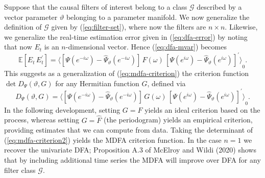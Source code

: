 \documentclass[a4paper]{book}
\def\EE{\mathbb E}
\begin{document}
Suppose that the causal filters of interest belong to a class
  $\mathcal{G}$  described by a vector parameter $\vartheta$ belonging to a 
 parameter manifold.  We now generalize the definition of $\mathcal{G}$ given
  by (\ref{eq:filter-set}),  where now the filters are $n \times n$.
  Likewise, we generalize the real-time estimation error   given in (\ref{eq:dfa-error})
 by noting that now $E_t$ is an $n$-dimensional vector.  
  Hence (\ref{eq:dfa-mvar}) becomes
\begin{equation}
 \label{eq:dfa-mvar2}
   \EE [ E_t \, E_t^{\prime} ]  = 
   { \langle  \left[ \Psi ( e^{-i \omega} ) -  
   \widehat{\Psi}_{\vartheta} (e^{-i \omega}) \right] \,   F (\omega) \,
  {  \left[ \Psi (e^{i \omega}) -  \widehat{\Psi}_{\vartheta} (e^{i \omega}) \right] }^{\prime} \rangle }_0.
\end{equation}
   This suggests as a generalization of (\ref{eq:mdfa-criterion})
   the criterion function  $\det D_{\Psi} (\vartheta, G)$ for
 any Hermitian function $G$, defined via
\begin{equation}
\label{eq:mdfa-criterion2}
 D_{\Psi} (\vartheta, G) = { \langle  \left[ \Psi (e^{-i \omega}) - 
  \widehat{\Psi}_{\vartheta} (e^{-i \omega}) \right] \,   G (\omega) \,
  {  \left[ \Psi (e^{i \omega}) -  \widehat{\Psi}_{\vartheta} (e^{i \omega}) \right] }^{\prime} \rangle }_0.
\end{equation}
  In the following development, setting $G = F$ yields an ideal criterion based on the process,
 whereas setting $G =  \widehat{F}$ (the periodogram) yields an empirical criterion,
 providing estimates  that we can compute from data.  
 Taking the determinant of (\ref{eq:mdfa-criterion2}) yields
 the MDFA criterion function.   In the case $n=1$ we recover the univariate DFA; 
 Proposition A.3 of McElroy and Wildi (2020)  shows
that by including additional time series the MDFA will  improve over DFA for any filter class $\mathcal{G}$.
\end{document}
